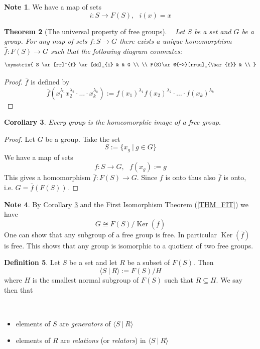 \documentclass[12pt, letterpaper, oneside]{article}
\theoremstyle{plain}
\newtheorem{theorem}{Theorem}[section]
\newtheorem{corollary}[theorem]{Corollary}
\theoremstyle{definition}
\newtheorem{definition}[theorem]{Definition}
\newtheorem{note}[theorem]{Note}
\newcommand{\Ker}{\operatorname{Ker}}
\newcommand{\subgp}[1]{\langle#1\rangle}
\newcommand{\bit}{\begin{itemize}}
\newcommand{\eit}{\end{itemize}}
\newcommand{\vs}{\vskip 5mm}
\begin{document}
\vs


\begin{note}
We have a map of sets 
$$i\colon S \to F(S), \ \ \ i(x) = x$$
\end{note}

\begin{theorem}[The universal property of free groups] \ \newline
Let $S$ be a set and $G$ be a group. For any map of sets $f\colon S \to G$
there exists a unique homomorphism $\bar f\colon F(S) \to G$ such that the 
following diagram commutes:
$$
\xymatrix{
S \ar[rr]^{f} \ar[dd]_{i} & & G \\
\\
F(S)\ar@{-->}[rruu]_{\bar{f}} & \\
}
$$
\end{theorem}

\begin{proof}
$\bar f$ is defined by
$$\bar f (x_{1}^{\lambda_{1}}x_{2}^{\lambda_{2}}\cdot\dots \cdot x_{k}^{\lambda_{k}}):=
f (x_{1})^{\lambda_{1}} f(x_{2})^{\lambda_{2}}\cdot\dots \cdot  f(x_{k})^{\lambda_{k}}
$$
\end{proof}

\vs

\begin{corollary}
\label{COR_FREEIM}
Every group is the homeomorphic image of a free group. 
\end{corollary}

\begin{proof}
Let $G$ be a group. Take the set 
$$S := \{ x_{g} \ | \ g\in G \}$$ 
We have a map of sets 
$$f\colon S \to G, \ \ \ f(x_{g}) := g$$
This gives a homomorphism $\bar f \colon F(S) \to G$. Since $f$ is onto thus also $\bar f$ is onto, 
i.e. $G = \bar{f}(F(S))$.
\end{proof}

\vs

\begin{note}
By Corollary \ref{COR_FREEIM} and the First Isomorphism Theorem (\ref{THM_FIT}) we have
$$G \cong F(S)/\Ker(\bar f)$$
One can show that any subgroup of a free group is free. In particular $\Ker(\bar f)$ is free.
This shows that any group is isomorphic to a quotient of two free groups. 
\end{note}

\vs\vs

\begin{definition}
Let $S$ be a set and let $R$ be a subset of $F(S)$. Then
$$\subgp{S \ | \ R} := F(S)/H$$
where $H$ is the smallest normal subgroup of $F(S)$ such that $R\subseteq H$. 
We say then that 

\vskip -13mm

\ 
\bit
\item elements of $S$ are \emph{generators} of $\subgp{S \ | \ R}$
\item elements of $R$ are \emph{relations} (or \emph{relators}) in $\subgp{S \ | \ R}$
\eit

\end{definition}
\end{document}
